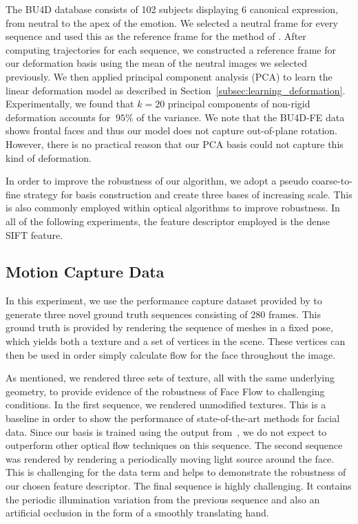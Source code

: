 The BU4D database consists of 102 subjects displaying 6 canonical expression,
from neutral to the apex of the emotion. We selected a neutral frame for every
sequence and used this as the reference frame for the method of \citet{Garg:2013hu}.
After computing trajectories for each sequence,
we constructed a reference frame for our deformation basis using the mean
of the neutral images we selected previously. We then applied principal
component analysis (PCA) to learn the linear deformation model as described in Section~\ref{subsec:learning_deformation}.
Experimentally, we found that $k=20$ principal components of
non-rigid deformation accounts for $~95\%$ of the variance.
We note that the BU4D-FE data shows frontal faces and thus our model does not capture out-of-plane
rotation. However, there is no practical reason that our PCA basis could not capture
this kind of deformation.

In order to improve the robustness of our algorithm, we adopt a pseudo coarse-to-fine
strategy for basis construction and create three bases of increasing scale. This is also
commonly employed within optical algorithms to improve robustness. In all of the following experiments,
the feature descriptor employed is the dense SIFT feature.
\subsection{Motion Capture Data}\label{subsec:experiments_mocap}
In this experiment, we use the performance capture dataset provided by \citet{zhang2008spacetime}
to generate three novel ground truth sequences consisting of 280 frames. This ground truth is provided by rendering
the sequence of meshes in a fixed pose, which yields both a texture and a set of vertices
in the scene. These vertices can then be used in order simply calculate flow for the face
throughout the image.

As mentioned, we rendered three sets of texture, all with the same underlying geometry,
to provide evidence of the robustness of Face Flow to challenging conditions. In the first
sequence, we rendered unmodified textures. This is a baseline
in order to show the performance of state-of-the-art methods for facial data. Since
our basis is trained using the output from~\cite{Garg:2013hu}, we do not expect to
outperform other optical flow techniques on this sequence. The second sequence
was rendered by rendering a periodically moving light source around the face. This
is challenging for the data term and helps to demonstrate the
robustness of our chosen feature descriptor. The final sequence is highly challenging. It contains
the periodic illumination variation from the previous sequence and also an artificial
occlusion in the form of a smoothly translating hand.

